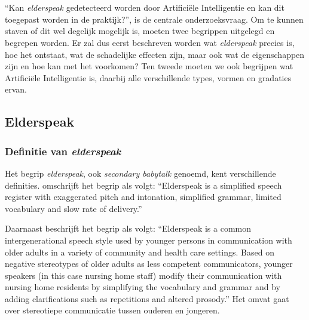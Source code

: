 \chapter{}
\label{ch:stand-van-zaken}



``Kan \textit{elderspeak} gedetecteerd worden door Artificiële Intelligentie en kan dit toegepast worden in de praktijk?'', is de centrale onderzoeksvraag. 
Om te kunnen staven of dit wel degelijk mogelijk is, moeten twee begrippen uitgelegd en begrepen worden.
Er zal dus eerst beschreven worden wat \textit{elderspeak} precies is, hoe het ontstaat, wat de schadelijke effecten zijn, maar ook wat de eigenschappen zijn en hoe kan met het voorkomen?
Ten tweede moeten we ook begrijpen wat Artificiële Intelligentie is, daarbij alle verschillende types, vormen en gradaties ervan.

\section{Elderspeak}

\subsection{Definitie van \textit{elderspeak}}

Het begrip \textit{elderspeak}, ook \textit{secondary babytalk} genoemd, kent verschillende definities. \textcite{Kemper1998} omschrijft het begrip als volgt:
``Elderspeak is a simplified speech register with exaggerated pitch and intonation, simplified grammar, limited vocabulary and slow rate of delivery.''

Daarnaast beschrijft \textcite{Williams2011} het begrip als volgt:
``Elderspeak is a common intergenerational speech style used by younger persons in communication with older adults in a variety of community and health care settings. Based on negative stereotypes of older adults as less competent communicators, younger speakers (in this case nursing home staff) modify their communication with nursing home residents by simplifying the vocabulary and grammar and by adding clarifications such as repetitions and altered prosody.'' Het omvat gaat over stereotiepe communicatie tussen ouderen en jongeren.

